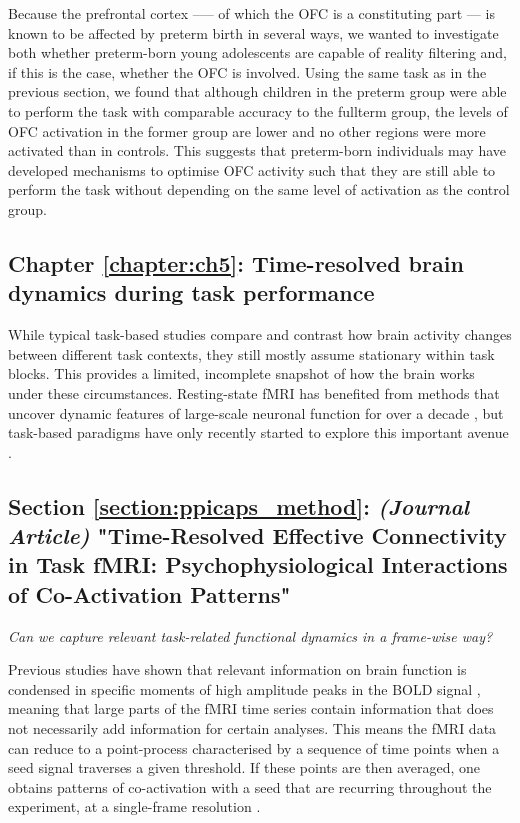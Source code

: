 Because the prefrontal cortex ––– of which the OFC is a constituting part ---  is known to be affected by preterm birth in several ways, we wanted to investigate both whether preterm-born young adolescents are capable of reality filtering and, if this is the case, whether the OFC is involved. Using the same task as in the previous section, we found that although children in the preterm group were able to perform the task with comparable accuracy to the fullterm group, the levels of OFC activation in the former group are lower and no other regions were more activated than in controls. This suggests that preterm-born individuals may have developed mechanisms to optimise OFC activity such that they are still able to perform the task without depending on the same level of activation as the control group.


\subsection*{Chapter \ref{chapter:ch5}: Time-resolved brain dynamics during task performance}

While typical task-based studies compare and contrast how brain activity changes between different task contexts, they still mostly assume stationary within task blocks. This provides a limited, incomplete snapshot of how the brain works under these circumstances. Resting-state fMRI has benefited from methods that uncover dynamic features of large-scale neuronal function for over a decade \citep{Chang2010}, but task-based paradigms have only recently started to explore this important avenue \citep{Gonzalez-Castillo2018}.

\subsection*{Section \ref{section:ppicaps_method}: \textit{(Journal Article)} "Time-Resolved Effective Connectivity in Task fMRI: Psychophysiological Interactions of Co-Activation Patterns"}
\textit{Can we capture relevant task-related functional dynamics in a frame-wise way?}


Previous studies have shown that relevant information on brain function is condensed in specific moments of high amplitude peaks in the BOLD signal \citep{Tagliazucchi2011a}, meaning that large parts of the fMRI time series contain information that does not necessarily add information for certain analyses. This means the fMRI data can reduce to a point-process \citep{Tagliazucchi2012} characterised by a sequence of time points when a seed signal traverses a given threshold. If these points are then averaged, one obtains patterns of co-activation with a seed that are recurring throughout the experiment, at a single-frame resolution \citep{Liu2013}.

